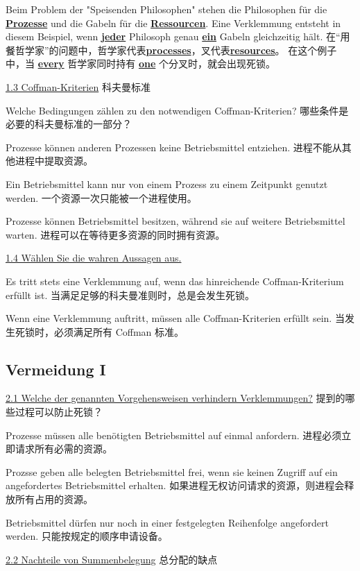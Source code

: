 \documentclass[fleqn]{article}
\begin{document}
\noindent Beim Problem der "Speisenden Philosophen" stehen die Philosophen für die \uline{\textbf{Prozesse}} und die Gabeln für die \uline{\textbf{Ressourcen}}. Eine Verklemmung entsteht in diesem Beispiel, wenn \uline{\textbf{jeder}} Philosoph genau \uline{\textbf{ein}} Gabeln gleichzeitig hält.
在“用餐哲学家”的问题中，哲学家代表\uline{\textbf{processes}}，叉代表\uline{\textbf{resources}}。 在这个例子中，当 \uline{\textbf{every}} 哲学家同时持有 \uline{\textbf{one}} 个分叉时，就会出现死锁。

\noindent\uline{1.3 Coffman-Kriterien} 科夫曼标准

\noindent Welche Bedingungen zählen zu den notwendigen Coffman-Kriterien?
哪些条件是必要的科夫曼标准的一部分？

Prozesse können anderen Prozessen keine Betriebsmittel entziehen.
进程不能从其他进程中提取资源。

Ein Betriebsmittel kann nur von einem Prozess zu einem Zeitpunkt genutzt werden.
一个资源一次只能被一个进程使用。

Prozesse können Betriebsmittel besitzen, während sie auf weitere Betriebsmittel warten.
进程可以在等待更多资源的同时拥有资源。

\noindent\uline{1.4 Wählen Sie die wahren Aussagen aus.}

Es tritt stets eine Verklemmung auf, wenn das hinreichende Coffman-Kriterium erfüllt ist.
当满足足够的科夫曼准则时，总是会发生死锁。

Wenn eine Verklemmung auftritt, müssen alle Coffman-Kriterien erfüllt sein.
当发生死锁时，必须满足所有 Coffman 标准。


\subsection{Vermeidung I}

\noindent\uline{2.1 Welche der genannten Vorgehensweisen verhindern Verklemmungen?}
提到的哪些过程可以防止死锁？

Prozesse müssen alle benötigten Betriebsmittel auf einmal anfordern.
进程必须立即请求所有必需的资源。

Prozsse geben alle belegten Betriebsmittel frei, wenn sie keinen Zugriff auf ein angefordertes Betriebsmittel erhalten.
如果进程无权访问请求的资源，则进程会释放所有占用的资源。

Betriebsmittel dürfen nur noch in einer festgelegten Reihenfolge angefordert werden.
只能按规定的顺序申请设备。

\noindent\uline{2.2 Nachteile von Summenbelegung} 总分配的缺点
\end{document}
